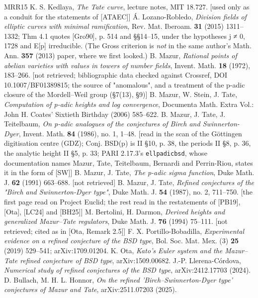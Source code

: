 \documentclass[11pt,a4paper]{article}
\theoremstyle{named}
\begin{document}
\begin{thebibliography}{MRR15}
 K. S. Kedlaya, \textit{The Tate curve}, lecture notes, MIT 18.727. [used only as a conduit for the statements of [ATAEC]]
 Á. Lozano-Robledo, \textit{Division fields of elliptic curves with minimal ramification}, Rev. Mat. Iberoam. \textbf{31} (2015) 1311–1332; Thm 4.1 quotes [Gro90], p. 514 and §§14–15, under the hypotheses j ≠ 0, 1728 and E[p] irreducible. (The Gross criterion is \textit{not} in the same author's Math. Ann. \textbf{357} (2013) paper, where we first looked.)
 B. Mazur, \textit{Rational points of abelian varieties with values in towers of number fields}, Invent. Math. \textbf{18} (1972), 183–266. [not retrieved; bibliographic data checked against Crossref, DOI 10.1007/BF01389815; the source of "anomalous", and a treatment of the p-adic closure of the Mordell–Weil group (§7(13), §9)]
 B. Mazur, W. Stein, J. Tate, \textit{Computation of p-adic heights and log convergence}, Documenta Math. Extra Vol.: John H. Coates' Sixtieth Birthday (2006) 585–622.
 B. Mazur, J. Tate, J. Teitelbaum, \textit{On p-adic analogues of the conjectures of Birch and Swinnerton-Dyer}, Invent. Math. \textbf{84} (1986), no. 1, 1–48. [read in the scan of the Göttingen digitisation centre (GDZ); Conj. BSD(p) is II §10, p. 38, the periods II §8, p. 36, the analytic height II §5, p. 33; PARI 2.17.3's \texttt{ellpadicbsd}, whose documentation names Mazur, Tate, Teitelbaum, Bernardi and Perrin-Riou, states it in the form of [SW]]
 B. Mazur, J. Tate, \textit{The p-adic sigma function}, Duke Math. J. \textbf{62} (1991) 663–688. [not retrieved]
 B. Mazur, J. Tate, \textit{Refined conjectures of the "Birch and Swinnerton-Dyer type"}, Duke Math. J. \textbf{54} (1987), no. 2, 711–750. [the first page read on Project Euclid; the rest read in the restatements of [PB19], [Ota], [LC24] and [BH25]]
 M. Bertolini, H. Darmon, \textit{Derived heights and generalized Mazur–Tate regulators}, Duke Math. J. \textbf{76} (1994) 75–111. [not retrieved; cited as in [Ota, Remark 2.5]]
 F. X. Portillo-Bobadilla, \textit{Experimental evidence on a refined conjecture of the BSD type}, Bol. Soc. Mat. Mex. (3) \textbf{25} (2019) 529–541; arXiv:1709.01204.
 K. Ota, \textit{Kato's Euler system and the Mazur–Tate refined conjecture of BSD type}, arXiv:1509.00682.
 J.-P. Llerena-Córdova, \textit{Numerical study of refined conjectures of the BSD type}, arXiv:2412.17703 (2024).
 D. Bullach, M. H. L. Honnor, \textit{On the refined 'Birch–Swinnerton-Dyer type' conjectures of Mazur and Tate}, arXiv:2511.07203 (2025).

\end{thebibliography}
\end{document}
